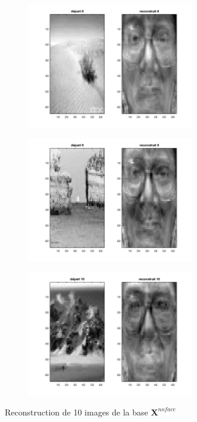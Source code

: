 \documentclass[a4paper]{article}
\begin{document}
\begin{figure}[H]
\begin{subfigure}[c]{0.24\textwidth}
    \end{subfigure}    
    \begin{subfigure}[c]{0.24\textwidth}
        \centering
        \includegraphics[width=0.8\textwidth]{images/ex5_noface8.png}
    \end{subfigure}    

    \begin{subfigure}[c]{0.24\textwidth}
        \centering
        \includegraphics[width=0.8\textwidth]{images/ex5_noface9.png}
    \end{subfigure}    
    \begin{subfigure}[c]{0.24\textwidth}
        \centering
        \includegraphics[width=0.8\textwidth]{images/ex5_noface10.png}
    \end{subfigure}    

    \caption{Reconstruction de 10 images de la base $\mathbf{X}^{noface}$} 
    \label{fig:ex5-rec-nofaces}
\end{figure}
\end{document}
